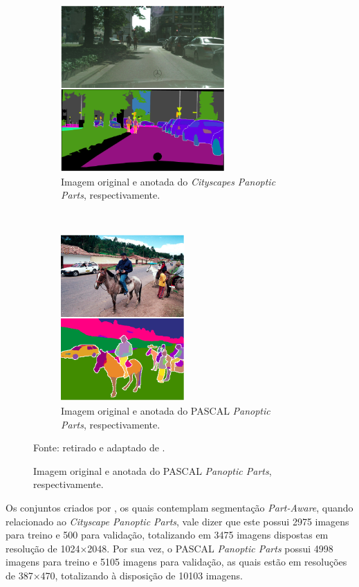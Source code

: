 \begin{figure}[H]
   \caption{Imagens originais e anotadas dos \textit{datasets} para \textit{Part-Aware Panoptic Segmentation}.}
   \centering
   \label{project:dataset:fig:1}
    \begin{subfigure}[t]{0.45\textwidth}
        \centering
        \includegraphics[height=2.5in]{recursos/imagens/proposal/city.png}
        \caption{Imagem original e anotada do \textit{Cityscapes Panoptic Parts}, respectivamente.}
        \label{project:dataset:fig:1.1}
    \end{subfigure}%
    ~ 
    \begin{subfigure}[t]{0.45\textwidth}
        \centering
        \includegraphics[height=2.5in]{recursos/imagens/proposal/pascal.png}
        \caption{Imagem original e anotada do PASCAL \textit{Panoptic Parts}, respectivamente.}
        \label{project:dataset:fig:1.2}
    \end{subfigure}%

    Fonte: retirado e adaptado de \cite{Lin2016}.
\end{figure}


Os conjuntos criados por \cite{DeGeus2021}, os quais contemplam segmentação \textit{Part-Aware}, quando relacionado ao \textit{Cityscape Panoptic Parts}, vale dizer que este possui 2975 imagens para treino e 500 para validação, totalizando em 3475 imagens dispostas em resolução de 1024×2048. Por sua vez, o PASCAL \textit{Panoptic Parts} possui 4998 imagens para treino e  5105 imagens para validação, as quais estão em resoluções de 387×470, totalizando à disposição de 10103 imagens.

